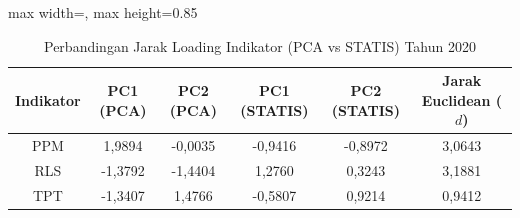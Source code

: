 \begin{table}[H]
\centering
\caption{Perbandingan Jarak Loading Indikator (PCA vs STATIS) Tahun 2020} \label{tab:sample2jarak_loading_2020}
\begin{adjustbox}{max width=\textwidth, max height=0.85\textheight}
\begin{tabular}{|c|c|c|c|c|c|}
\hline
\textbf{Indikator} & \textbf{PC1 (PCA)} & \textbf{PC2 (PCA)} & \textbf{PC1 (STATIS)} & \textbf{PC2 (STATIS)} & \textbf{Jarak Euclidean ($d$)} \\
\hline
PPM & 1,9894 & -0,0035 & -0,9416 & -0,8972 & 3,0643 \\
RLS & -1,3792 & -1,4404 & 1,2760 & 0,3243 & 3,1881 \\
TPT & -1,3407 & 1,4766 & -0,5807 & 0,9214 & 0,9412 \\
\hline
\end{tabular}
\end{adjustbox}
\end{table}